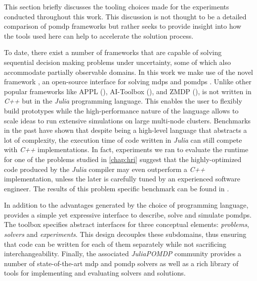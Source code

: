 This section briefly discusses the tooling choices made for the experiments
conducted throughout this work. This discussion is not thought to be a detailed
comparison of \ac{pomdp} frameworks but rather seeks to provide insight into
how the tools used here can help to accelerate the solution process.

To date, there exist a number of frameworks that are capable of solving
sequential decision making problems under uncertainty, some of which also
accommodate partially observable domains. In this work we make use of the novel
framework \pomdpsjl, an open-source interface for solving \acp{mdp} and
\acp{pomdp} \cite{egorov2017pomdps}. Unlike other popular frameworks like APPL
(\cite{appl}), AI-Toolbox (\cite{aitoolbox}), and ZMDP (\cite{zmdp}), \pomdpsjl
is not written in \emph{C++} but in the \emph{Julia} programming language. This
enables the user to flexibly build prototypes while the high-performance nature
of the language allows to scale ideas to run extensive simulations on large
multi-node clusters. Benchmarks in the past have shown that despite being
a high-level language that abstracts a lot of complexity, the execution time of
code written in \emph{Julia} can still compete with \emph{C++} implementations.
In fact, experiments we ran to evaluate the runtime for one of the problems
studied in \cref{chap:hri} suggest that the highly-optimized code produced by
the \emph{Julia} compiler may even outperform a \emph{C++} implementation,
unless the later is carefully tuned by an experienced software engineer. The
results of this problem specific benchmark can be found in .

In addition to the advantages generated by the choice of programming language,
\pomdpsjl provides a simple yet expressive interface to describe, solve and
simulate \acp{pomdp}. The toolbox specifies abstract interfaces for three
conceptual elements: \emph{problems}, \emph{solvers} and \emph{experiments}.
This design decouples these subdomains, thus ensuring that code can be written
for each of them separately while not sacrificing interchangeability. Finally,
the associated \emph{JuliaPOMDP} community provides a number of
state-of-the-art \ac{mdp} and \ac{pomdp} solvers as well as a rich library of
tools for implementing and evaluating solvers and solutions.
